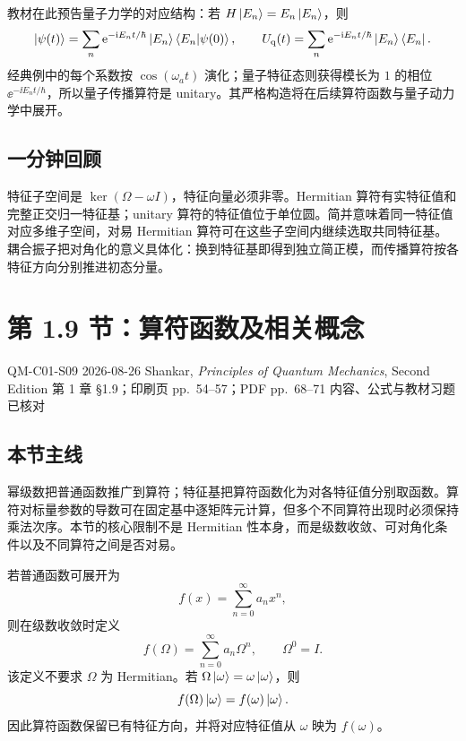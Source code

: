 教材在此预告量子力学的对应结构：若 $H\left|E_n\right\rangle=E_n\left|E_n\right\rangle$，则
\begin{equation}
  \left|\psi(t)\right\rangle
  =\sum_n\mathrm{e}^{-\mathrm{i} E_nt/\hbar}\left|E_n\right\rangle\left\langle E_n \middle| \psi(0) \right\rangle,
  \qquad
  U_{\mathrm q}(t)
  =\sum_n\mathrm{e}^{-\mathrm{i} E_nt/\hbar}\left|E_n\right\rangle\left\langle E_n\right|.
  \label{eq:QM-C01-S08-quantum-propagator-preview}
\end{equation}
经典例中的每个系数按 $\cos(\omega_at)$ 演化；量子特征态则获得模长为 $1$ 的相位 $\ee^{-\ii E_nt/\hbar}$，所以量子传播算符是 unitary。其严格构造将在后续算符函数与量子动力学中展开。

\subsection{一分钟回顾}

特征子空间是 $\ker(\Omega-\omega I)$，特征向量必须非零。Hermitian 算符有实特征值和完整正交归一特征基；unitary 算符的特征值位于单位圆。简并意味着同一特征值对应多维子空间，对易 Hermitian 算符可在这些子空间内继续选取共同特征基。耦合振子把对角化的意义具体化：换到特征基即得到独立简正模，而传播算符按各特征方向分别推进初态分量。

\section{第 1.9 节：算符函数及相关概念}
\label{section:QM-C01-S09}

\studymeta
  {QM-C01-S09}
  {2026-08-26}
  {Shankar, \textit{Principles of Quantum Mechanics}, Second Edition}
  {第 1 章 \S 1.9；印刷页 pp.~54--57；PDF pp.~68--71}
  {内容、公式与教材习题已核对}

\subsection{本节主线}

幂级数把普通函数推广到算符；特征基把算符函数化为对各特征值分别取函数。算符对标量参数的导数可在固定基中逐矩阵元计算，但多个不同算符出现时必须保持乘法次序。本节的核心限制不是 Hermitian 性本身，而是级数收敛、可对角化条件以及不同算符之间是否对易。


若普通函数可展开为
\[
  f(x)=\sum_{n=0}^{\infty}a_nx^n,
\]
则在级数收敛时定义
\begin{equation}
  f(\Omega)=\sum_{n=0}^{\infty}a_n\Omega^n,
  \qquad \Omega^0=I.
  \label{eq:QM-C01-S09-operator-function}
\end{equation}
该定义不要求 $\Omega$ 为 Hermitian。若 $\Omega\left|\omega\right\rangle=\omega\left|\omega\right\rangle$，则
\begin{equation}
  f(\Omega)\left|\omega\right\rangle=f(\omega)\left|\omega\right\rangle.
  \label{eq:QM-C01-S09-function-on-eigenvector}
\end{equation}
因此算符函数保留已有特征方向，并将对应特征值从 $\omega$ 映为 $f(\omega)$。

